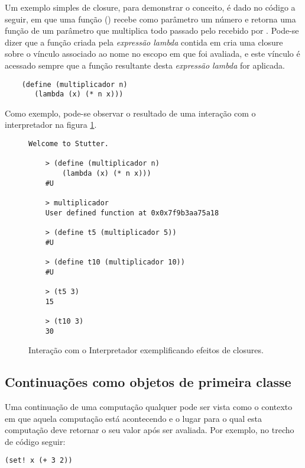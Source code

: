 Um exemplo simples de closure, para demonstrar o conceito, é dado no código a
seguir, em que uma função () recebe como parâmetro um
número  e retorna uma função de um parâmetro  que multiplica
todo  passado pelo  recebido por . Pode-se
dizer que a função criada pela \textit{expressão lambda} contida em
 cria uma closure sobre o vínculo associado ao nome 
no escopo em que foi avaliada, e este vínculo é acessado sempre que a função
resultante desta \textit{expressão lambda} for aplicada.

\begin{lstlisting}
    (define (multiplicador n)
       (lambda (x) (* n x)))
\end{lstlisting}

Como exemplo, pode-se observar o resultado de uma interação com o interpretador
na figura \ref{fig:interacao-closure}.

\begin{figure}[h!]
\begin{lstlisting}[numbers=none]
    Welcome to Stutter.
    
    > (define (multiplicador n) 
        (lambda (x) (* n x)))
    #U
    
    > multiplicador
    User defined function at 0x0x7f9b3aa75a18
    
    > (define t5 (multiplicador 5))
    #U
    
    > (define t10 (multiplicador 10))
    #U
    
    > (t5 3)
    15
    
    > (t10 3)
    30
\end{lstlisting}
\caption{Interação com o Interpretador exemplificando efeitos de closures.}
\label{fig:interacao-closure}
\end{figure}

\subsection{Continuações como objetos de primeira classe}
\label{ss:continuacoes}

Uma continuação de uma computação qualquer pode ser vista como o contexto em
que aquela computação está acontecendo e o lugar para o qual esta computação
deve retornar o seu valor após ser avaliada. Por exemplo, no trecho de código
seguir:

\begin{lstlisting}
(set! x (+ 3 2))

\end{lstlisting}

